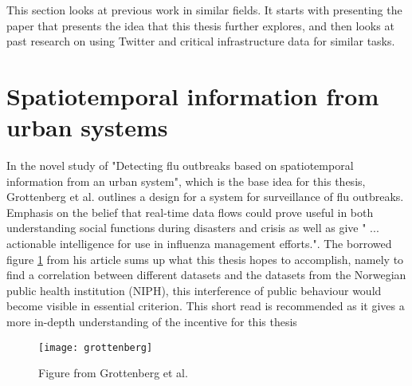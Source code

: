 This section looks at previous work in similar fields. It starts with presenting the paper that presents the idea that this thesis further explores, and then looks at past research on using Twitter and critical infrastructure data for similar tasks.

\section{Spatiotemporal information from urban systems}
In the novel study of "Detecting flu outbreaks based on spatiotemporal information from an urban system", which is the base idea for this thesis, Grottenberg et al. \cite{spatiotemp_urban_sys} outlines a design for a system for surveillance of flu outbreaks. Emphasis on the belief that real-time data flows could prove useful in both understanding social functions during disasters and crisis as well as give " ... actionable intelligence for use in influenza management efforts.".
The borrowed figure \ref{fig:grottenberg} from his article sums up what this thesis hopes to accomplish, namely to find a correlation between different datasets and the datasets from the Norwegian public health institution (NIPH), this interference of public behaviour would become visible in essential criterion.
This short read \cite{spatiotemp_urban_sys} is recommended as it gives a more in-depth understanding of the incentive for this thesis

\begin{figure}[h]
\texttt{[image: grottenberg]}
\centering
\caption{Figure from Grottenberg et al. \cite{spatiotemp_urban_sys}}
\label{fig:grottenberg}
\end{figure}


